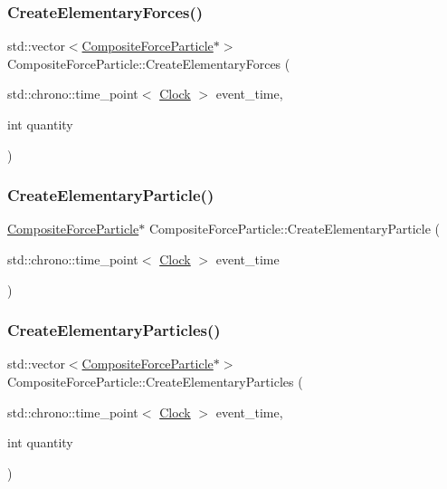 \subsubsection{\texorpdfstring{Create\+Elementary\+Forces()}{CreateElementaryForces()}}
{\footnotesize\ttfamily std\+::vector$<$\mbox{\hyperlink{classCompositeForceParticle}{Composite\+Force\+Particle}}$\ast$$>$ Composite\+Force\+Particle\+::\+Create\+Elementary\+Forces (\begin{DoxyParamCaption}\item[{std\+::chrono\+::time\+\_\+point$<$ \mbox{\hyperlink{universe_8h_a0ef8d951d1ca5ab3cfaf7ab4c7a6fd80}{Clock}} $>$}]{event\+\_\+time,  }\item[{int}]{quantity }\end{DoxyParamCaption})}

\mbox{\label{classCompositeForceParticle_a0806069e389e30c63572c4cd6b9776d7}} 
\subsubsection{\texorpdfstring{Create\+Elementary\+Particle()}{CreateElementaryParticle()}}
{\footnotesize\ttfamily \mbox{\hyperlink{classCompositeForceParticle}{Composite\+Force\+Particle}}$\ast$ Composite\+Force\+Particle\+::\+Create\+Elementary\+Particle (\begin{DoxyParamCaption}\item[{std\+::chrono\+::time\+\_\+point$<$ \mbox{\hyperlink{universe_8h_a0ef8d951d1ca5ab3cfaf7ab4c7a6fd80}{Clock}} $>$}]{event\+\_\+time }\end{DoxyParamCaption})}

\mbox{\label{classCompositeForceParticle_afff866fe6f363c33c3b49fcca9005706}} 
\subsubsection{\texorpdfstring{Create\+Elementary\+Particles()}{CreateElementaryParticles()}}
{\footnotesize\ttfamily std\+::vector$<$\mbox{\hyperlink{classCompositeForceParticle}{Composite\+Force\+Particle}}$\ast$$>$ Composite\+Force\+Particle\+::\+Create\+Elementary\+Particles (\begin{DoxyParamCaption}\item[{std\+::chrono\+::time\+\_\+point$<$ \mbox{\hyperlink{universe_8h_a0ef8d951d1ca5ab3cfaf7ab4c7a6fd80}{Clock}} $>$}]{event\+\_\+time,  }\item[{int}]{quantity }\end{DoxyParamCaption})}

